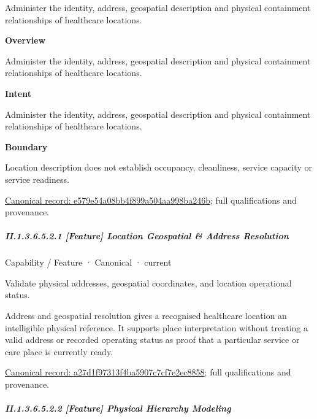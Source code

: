 Administer the identity, address, geospatial description and physical containment relationships of healthcare locations.



\textbf{Overview}



Administer the identity, address, geospatial description and physical containment relationships of healthcare locations.



\textbf{Intent}



Administer the identity, address, geospatial description and physical containment relationships of healthcare locations.



\textbf{Boundary}



Location description does not establish occupancy, cleanliness, service capacity or service readiness.


{\footnotesize \href{../../../../continuum/strategy/capability/e579e54a08bb4f899a504aa998ba246b.md}{Canonical record: e579e54a08bb4f899a504aa998ba246b}; full qualifications and provenance.}\par
\subparagraph*{II.1.3.6.5.2.1 [Feature] Location Geospatial \& Address Resolution}
\label{navigation:II.1.3.6.5.2.1}

\label{element:a27d1f97313f4ba5907c7cf7e2ec8858}
{\small Capability / Feature · Canonical · current}\par

Validate physical addresses, geospatial coordinates, and location operational status.



Address and geospatial resolution gives a recognised healthcare location an intelligible physical reference. It supports place interpretation without treating a valid address or recorded operating status as proof that a particular service or care place is currently ready.


{\footnotesize \href{../../../../continuum/strategy/capability/feature/a27d1f97313f4ba5907c7cf7e2ec8858.md}{Canonical record: a27d1f97313f4ba5907c7cf7e2ec8858}; full qualifications and provenance.}\par
\subparagraph*{II.1.3.6.5.2.2 [Feature] Physical Hierarchy Modeling}
\label{navigation:II.1.3.6.5.2.2}

